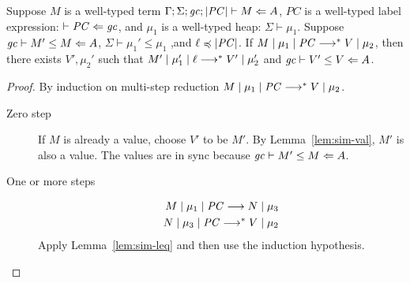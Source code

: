 \begin{lemma}
\label{lem:sim-mult}
Suppose $M$ is a well-typed \CC term $\Gamma ; \Sigma ; \mathit{gc} ; |\mathit{PC}| \vdash M \Leftarrow A$,
$PC$ is a well-typed label expression: $\vdash \mathit{PC} \Leftarrow \mathit{gc}$, and $\mu_1$ is a well-typed
heap: $\Sigma \vdash \mu_1$.
Suppose ${\mathit{gc}}\vdash{M'}\leq{M}\Leftarrow{A}$, $\Sigma \vdash \mu_1' \leq \mu_1$ ,and $\ell \preccurlyeq |\mathit{PC}|$.
If ${M}\mid{\mu_1}\mid{\ensuremath{\mathit{PC}}}\longrightarrow^{*}{V}\mid{\mu_2}$, then there exists $V',\mu_2'$ such that
${M'}\mid{\mu_1'}\mid{\ell}\longrightarrow^{*}{V'}\mid{\mu_2'}$
and ${\mathit{gc}}\vdash{V'}\leq{V}\Leftarrow{A}$.
\end{lemma}
\begin{proof}
By induction on multi-step reduction ${M}\mid{\mu_1}\mid{\ensuremath{\mathit{PC}}}\longrightarrow^{*}{V}\mid{\mu_2}$.
\begin{description}
\item[Zero step] If $M$ is already a value, choose $V'$ to be $M'$.
By Lemma~\ref{lem:sim-val}, $M'$ is also a value.
The values are in sync because ${\mathit{gc}}\vdash{M'}\leq{M}\Leftarrow{A}$.
\item[One or more steps]
\begin{align}
{M}\mid{\mu_1}\mid{\ensuremath{\mathit{PC}}}\longrightarrow{N}\mid{\mu_3} \\
{N}\mid{\mu_3}\mid{\ensuremath{\mathit{PC}}}\longrightarrow^{*}{V}\mid{\mu_2}
\end{align}
Apply Lemma~\ref{lem:sim-leq} and then use the induction hypothesis.
\end{description}
\end{proof}


